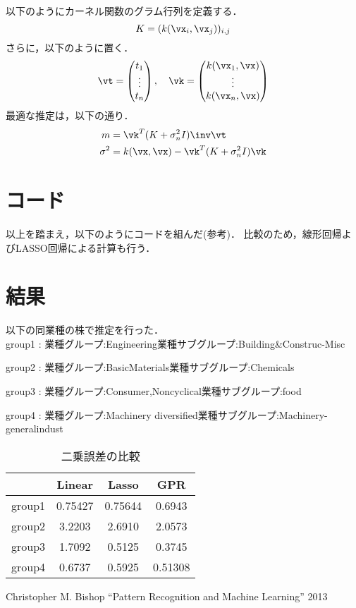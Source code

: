 \documentclass{jsarticle}
\begin{document}
\begin{thm}
 以下のようにカーネル関数のグラム行列を定義する．
 \[
  K=(k(\vx_i,\vx_j))_{i,j}
 \]
 さらに，以下のように置く．
 \[
  \vt=\begin{pmatrix}
       t_1\\\vdots\\t_n
      \end{pmatrix},\quad
 \vk=\begin{pmatrix}
	k(\vx_1,\vx)\\\vdots\\k(\vx_n,\vx)
     \end{pmatrix}
 \]
 最適な推定は，以下の通り．
 \begin{align*}
  m&=\vk^T(K+\sigma_n^2I)\inv \vt\\
  \sigma^2&=k(\vx,\vx)-\vk^T(K+\sigma_n^2I)\vk
 \end{align*}
\end{thm}

\section{コード}

以上を踏まえ，以下のようにコードを組んだ(参考\cite{GPY})．
比較のため，線形回帰よびLASSO回帰による計算も行う．



\section{結果}

以下の同業種の株で推定を行った．\\

group1 : 業種グループ:Engineering\quad 業種サブグループ:Building\&Construc-Misc

group2 : 業種グループ:BasicMaterials\quad 業種サブグループ:Chemicals

group3 : 業種グループ:Consumer,Noncyclical\quad 業種サブグループ:food

group4 : 業種グループ:Machinery diversified\quad 業種サブグループ:Machinery-generalindust



\begin{table}[htb]
\begin{center}
  \begin{tabular}{lccc}
     & Linear & Lasso & GPR \\\hline
    group1 & 0.75427 & 0.75644 & 0.6943 \\
    group2 & 3.2203 & 2.6910 & 2.0573 \\
    group3  & 1.7092 & 0.5125 & 0.3745 \\
    group4 & 0.6737 & 0.5925 & 0.51308 \\
  \end{tabular}
 \caption{二乗誤差の比較}
\end{center}
\end{table} 

\begin{thebibliography}{9}
  Christopher M. Bishop ``Pattern Recognition and Machine Learning'' 2013	  
\end{thebibliography}
\end{document}
